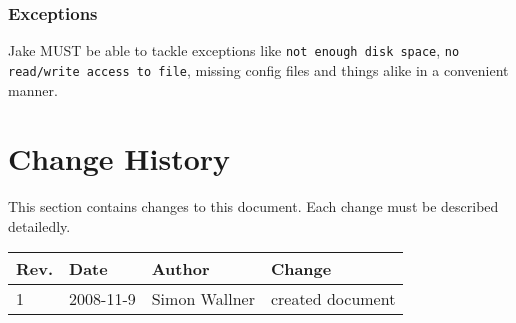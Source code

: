 \subsubsection{Exceptions}
Jake  MUST be able to tackle exceptions like \texttt{not enough disk space}, \texttt{no read/write access to file}, missing config files and things alike in a convenient manner. 





\section{Change History}
This section contains changes to this document. Each change must be described detailedly.
\begin{table}[h]
\begin{tabular}{|l|l|l|l|}
\hline
\textbf{Rev.} & \textbf{Date} & \textbf{Author} & \textbf{Change} \\
\hline
1 & 2008-11-9 & Simon Wallner & created document \\
\hline
\end{tabular}
\end{table}





